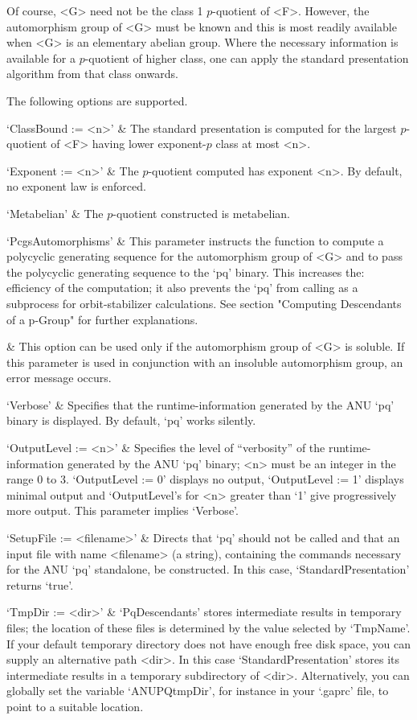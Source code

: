 Of course, <G> need not be the class 1 $p$-quotient of <F>. However,  the
automorphism group of  <G>  must  be  known  and  this  is  most  readily
available when <G> is an elementary abelian group.  Where  the  necessary
information is available for a $p$-quotient  of  higher  class,  one  can
apply the standard presentation algorithm from that class onwards.

The following options are supported.

\beginitems
`ClassBound := <n>' &
The standard presentation is computed for the largest $p$-quotient of <F>
having lower exponent-$p$ class at most <n>.

`Exponent := <n>' &
The $p$-quotient computed has exponent <n>. By default, no  exponent  law
is enforced.

`Metabelian' &
The $p$-quotient constructed is metabelian.

`PcgsAutomorphisms' &
This parameter instructs the function to compute a polycyclic  generating
sequence for the automorphism group of <G> and  to  pass  the  polycyclic
generating sequence to the `pq' binary. This increases the: efficiency of
the computation; it also prevents the  `pq'  from  calling  {\GAP}  as  a
subprocess for  orbit-stabilizer  calculations.  See  section  "Computing
Descendants of a p-Group" for further explanations.

&
This option can be used only if  the  automorphism  group  of  <G>  is
soluble. If this parameter is  used  in  conjunction  with  an  insoluble
automorphism group, an error message occurs.

`Verbose' &
Specifies that the runtime-information generated by the ANU  `pq'  binary
is displayed. By default, `pq' works silently.

`OutputLevel := <n>' &
Specifies the level of ``verbosity'' of the runtime-information generated
by the ANU `pq' binary; <n> must be an integer  in  the  range  0  to  3.
`OutputLevel := 0'  displays  no  output,  `OutputLevel  :=  1'  displays
minimal  output  and  `OutputLevel's  for  <n>  greater  than  `1'   give
progressively more output. This parameter implies `Verbose'. 

`SetupFile := <filename>' &
Directs that `pq' should not be called and that an input file  with  name
<filename> (a string), containing the commands necessary for the ANU `pq'
standalone, be constructed. In this case, `StandardPresentation'  returns
`true'.

`TmpDir := <dir>' &
`PqDescendants' stores  intermediate  results  in  temporary  files;  the
location of these files is determined by the value selected by `TmpName'.
If your default temporary directory does not have enough free disk space,
you   can   supply   an   alternative   path   <dir>.   In   this    case
`StandardPresentation' stores its intermediate  results  in  a  temporary
subdirectory of <dir>. Alternatively, you can globally set  the  variable
`ANUPQtmpDir', for instance in your `.gaprc' file, to point to a suitable
location.

